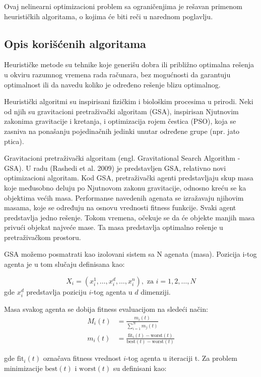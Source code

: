 Ovaj nelinearni optimizacioni problem sa ograničenjima je rešavan primenom heurističkih algoritama, o kojima će biti reči u narednom poglavlju.

\subsection{Opis korišćenih algoritama}

Heurističke metode su tehnike koje generišu dobra ili približno optimalna rešenja u okviru razumnog vremena rada računara, bez mogućnosti da garantuju optimalnost ili da navedu koliko je određeno rešenje blizu optimalnog.

Heuristički algoritmi su inspirisani fizičkim i biološkim procesima u prirodi. Neki od njih su gravitacioni pretraživački algoritam (GSA), inspirisan Njutnovim zakonima gravitacije i kretanja, i optimizacija rojem čestica (PSO), koja se zasniva na ponašanju pojedinačnih jedinki unutar određene grupe (npr. jato ptica).

Gravitacioni pretraživački algoritam (engl. Gravitational Search Algorithm - GSA). U radu (Rashedi et al. 2009) je predstavljen GSA, relativno novi optimizacioni algoritam. Kod GSA, pretraživački agenti predstavljaju skup masa koje međusobno deluju po Njutnovom zakonu gravitacije, odnosno kreću se ka objektima većih masa. Performanse navedenih agenata se izražavaju njihovim masama, koje se određuju na osnovu vrednosti fitness funkcije. Svaki agent predstavlja jedno rešenje. Tokom vremena, očekuje se da će objekte manjih masa privući objekat najveće mase. Ta masa predstavlja optimalno rešenje u pretraživačkom prostoru.

GSA možemo posmatrati kao izolovani sistem sa N agenata (masa). Pozicija i-tog agenta je u tom slučaju definisana kao:

\begin{equation*}
    X_i = (x_i^1, \dots, x_i^d, \dots, x_i^n), \mbox{ za } i = 1, 2, \dots, N
\end{equation*}
gde $x_i^d$ predstavlja poziciju $i$-tog agenta u $d$ dimenziji.

Masa svakog agenta se dobija fitness evaluacijom na sledeći način:
\begin{align}
    M_i(t) &= \frac{m_i(t)}{\sum_{i=1}^{N} m_j(t)} \\
    m_i(t) &= \frac{\mathrm{fit}_i(t) - \mathrm{worst}(t)}{\mathrm{best}(t) - \mathrm{worst}(t)} \nonumber
\end{align}

gde $\mathrm{fit}_i(t)$ označava fitness vrednost $i$-tog agenta u iteraciji t. Za problem minimizacije $\mathrm{best}(t)$  i $\mathrm{worst}(t)$ su definisani kao:

